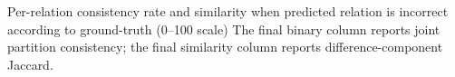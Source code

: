 \begin{table}[!t]
\setlength{\tabcolsep}{3pt}
\centering
\caption{Per-relation consistency rate and similarity when predicted relation is incorrect according to ground-truth (0--100 scale) \textcolor{blue!60!black}{The} \textcolor{blue!60!black}{final} \textcolor{blue!60!black}{binary} \textcolor{blue!60!black}{column} \textcolor{blue!60!black}{reports} \textcolor{blue!60!black}{joint} \textcolor{blue!60!black}{partition} \textcolor{blue!60!black}{consistency}\textcolor{blue!60!black}{;} \textcolor{blue!60!black}{the} \textcolor{blue!60!black}{final} \textcolor{blue!60!black}{similarity} \textcolor{blue!60!black}{column} \textcolor{blue!60!black}{reports} \textcolor{blue!60!black}{difference-component} \textcolor{blue!60!black}{Jaccard}\textcolor{blue!60!black}{.}}
\footnotesize
{}


\end{table}
